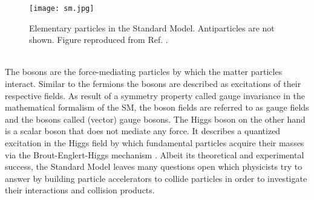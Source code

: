 \documentclass[../../main.tex]{subfiles}
\begin{document}
\begin{figure}[htp]
	\begin{center}
		\texttt{[image: sm.jpg]}
		\caption{Elementary particles in the Standard Model. Antiparticles are not shown. Figure reproduced from Ref. \cite{wiki_sm}.}
		\label{fig:sm}
	\end{center}
\end{figure}
\\
The bosons are the force-mediating particles by which the matter particles interact. Similar to the fermions the bosons are described as excitations of their respective fields. As result of a symmetry property called gauge invariance in the mathematical formalism of the SM, the boson fields are referred to as gauge fields and the bosons called (vector) gauge bosons. The Higgs boson on the other hand is a scalar boson that does not mediate any force. It describes a quantized excitation in the Higgs field by which fundamental particles acquire their masses via the Brout-Englert-Higgs mechanism \cite{higgs64, brout64}. Albeit its theoretical and experimental success, the Standard Model leaves many questions open which physicists try to answer by building particle accelerators to collide particles in order to investigate their interactions and collision products.
\end{document}
